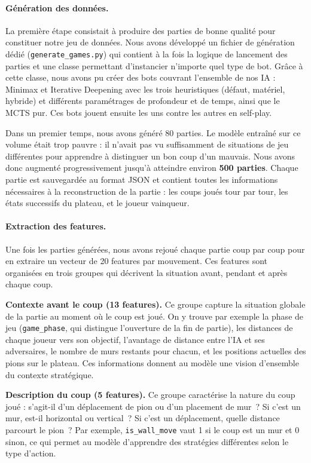 \documentclass[a4paper]{article}
\begin{document}
\paragraph{Génération des données.}
La première étape consistait à produire des parties de bonne qualité pour
constituer notre jeu de données. Nous avons développé un fichier de génération
dédié (\texttt{generate\_games.py}) qui contient à la fois la logique de
lancement des parties et une classe permettant d'instancier n'importe quel
type de bot. Grâce à cette classe, nous avons pu créer des bots couvrant
l'ensemble de nos IA : Minimax et Iterative Deepening avec les trois
heuristiques (défaut, matériel, hybride) et différents paramétrages de
profondeur et de temps, ainsi que le MCTS pur. Ces bots jouent ensuite les
uns contre les autres en self-play.

Dans un premier temps, nous avons généré 80 parties. Le modèle entraîné sur
ce volume était trop pauvre : il n'avait pas vu suffisamment de situations
de jeu différentes pour apprendre à distinguer un bon coup d'un mauvais.
Nous avons donc augmenté progressivement jusqu'à atteindre environ
\textbf{500 parties}. Chaque partie est sauvegardée au format JSON et
contient toutes les informations nécessaires à la reconstruction de la
partie : les coups joués tour par tour, les états successifs du plateau,
et le joueur vainqueur.

\paragraph{Extraction des features.}
Une fois les parties générées, nous avons rejoué chaque partie coup par coup
pour en extraire un vecteur de 20 features par mouvement. Ces features sont
organisées en trois groupes qui décrivent la situation avant, pendant et
après chaque coup.

\textbf{Contexte avant le coup (13 features).}
Ce groupe capture la situation globale de la partie au moment où le coup
est joué. On y trouve par exemple la phase de jeu (\texttt{game\_phase},
qui distingue l'ouverture de la fin de partie), les distances de chaque
joueur vers son objectif, l'avantage de distance entre l'IA et ses
adversaires, le nombre de murs restants pour chacun, et les positions
actuelles des pions sur le plateau. Ces informations donnent au modèle
une vision d'ensemble du contexte stratégique.

\textbf{Description du coup (5 features).}
Ce groupe caractérise la nature du coup joué : s'agit-il d'un déplacement
de pion ou d'un placement de mur~? Si c'est un mur, est-il horizontal ou
vertical~? Si c'est un déplacement, quelle distance parcourt le pion~?
Par exemple, \texttt{is\_wall\_move} vaut 1 si le coup est un mur et 0
sinon, ce qui permet au modèle d'apprendre des stratégies différentes
selon le type d'action.
\end{document}
